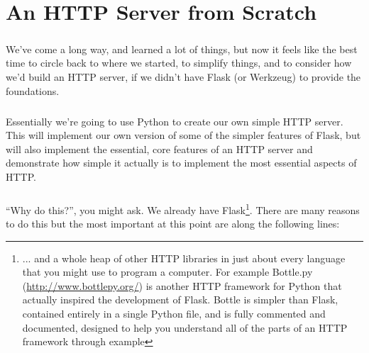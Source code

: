 \chapter{An HTTP Server from Scratch}
\label{http-server-from-scratch}
\paragraph{} We've come a long way, and learned a lot of things, but now it feels like the best time to circle back to where we started, to simplify things, and to consider how we'd build an HTTP server, if we didn't have Flask (or Werkzeug) to provide the foundations.

\paragraph{} Essentially we're going to use Python to create our own simple HTTP server. This will implement our own version of some of the simpler features of Flask, but will also implement the essential, core features of an HTTP server and demonstrate how simple it actually is to implement the most essential aspects of HTTP.

\paragraph{} ``Why do this?'', you might ask. We already have Flask\footnote{... and a whole heap of other HTTP libraries in just about every language that you might use to program a computer. For example Bottle.py (\url{http://www.bottlepy.org/}) is another HTTP framework for Python that actually inspired the development of Flask. Bottle is simpler than Flask, contained entirely in a single Python file, and is fully commented and documented, designed to help you understand all of the parts of an HTTP framework through example}. There are many reasons to do this but the most important at this point are along the following lines:


